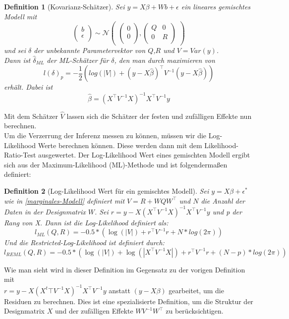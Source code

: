 \documentclass[%
thesis=student,%
coverpage=false,%
titlepage=false,%
headmarks=true, %
german,%
font=libertine, %
math=newpxtx, %
BCOR=5mm,%
coverBCOR=11mm%
]{tumbook}
\theoremstyle{break}
\newtheorem{definition}{Definition}[section]
\begin{document}
\begin{definition}[Kovarianz-Schätzer]
	Sei $y = X\beta + Wb + \epsilon $ ein lineares gemischtes Modell mit $$\begin{pmatrix}
		b \\
		\epsilon \\
	\end{pmatrix}
	\sim
	\mathcal{N}
	\begin{pmatrix}
		\begin{pmatrix}
			
			0 \\
			0 \\
		\end{pmatrix},
		\begin{pmatrix}
			Q & 0 \\
			0 & R \\
		\end{pmatrix}
	\end{pmatrix}$$ und sei $\delta$ der unbekannte Parametervektor von $Q$,$R$ und $V=Var(y)$. \\
	Dann ist $\hat{\delta}_{ML}$ der ML-Schätzer für $\delta$, den man durch maximieren von $$  l(\delta)_p = - \frac{1}{2} (log(|V|)+(y-X\hat{\beta})^{\top}V^{-1}(y-X\hat{\beta})) $$erhält.
	Dabei ist $$ \hat{\beta} = (X^{\top}V^{-1}X)^{-1}X^{\top}V^{-1}y$$
\end{definition} \noindent
Mit dem Schätzer $\hat{V}$ lassen sich die Schätzer der festen und zufälligen Effekte nun berechnen.\\
Um die Verzerrung der Inferenz messen zu können, müssen wir die  Log-Likelihood Werte berechnen können. Diese werden dann mit dem Likelihood-Ratio-Test ausgewertet. Der Log-Likelihood Wert eines gemischten Modell ergibt sich aus der Maximum-Likelihood (ML)-Methode und ist folgendermaßen definiert:
\begin{definition}[Log-Likelihood Wert für ein gemischtes Modell]
	Sei $y=X\beta + \epsilon^*$ wie in \ref{marginales-Modell} definiert mit $V = R + WQW^{\top}$ und $N$ die Anzahl der Daten in der Designmatrix $W$. Sei $r = y - X(X^{\top}V^{-1}X)^{-1}X^{\top}V^{-1}y$ und p der Rang von X. Dann ist  die Log-Likelihood definiert als:
	$$ l_{ML}(Q,R) = -0.5 * (\log(|V|)+ r^{\top}V^{-1}r + N * log(2\pi))$$
	Und die Restricted-Log-Likelihood ist definiert durch:
	$$l_{REML}(Q,R) = -0.5 * (\log(|V|)+ \log(|X^{\top}V^{-1}X|) + r^{\top}V^{-1}r+ (N-p) * log(2\pi))$$ \label{def:log-likelihood}
\end{definition}\noindent
Wie man sieht wird in dieser Definition im Gegensatz zu der vorigen Definition mit \\ $r=y - X(X^t{\top}V^{-1}X)^{-1}X^{\top}V^{-1}y$ anstatt $(y-X\beta)$ gearbeitet, um die Residuen zu berechnen. Dies ist eine spezialisierte Definition, um die Struktur der Designmatrix $X$ und der zufälligen Effekte $WV^{-1}W^{\top}$ zu berücksichtigen.\\
\end{document}
